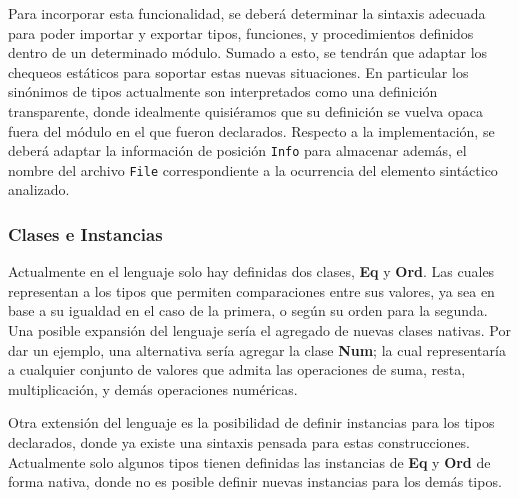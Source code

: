 Para incorporar esta funcionalidad, se deberá determinar la sintaxis adecuada para poder importar y exportar tipos, funciones, y procedimientos definidos dentro de un determinado módulo.
Sumado a esto, se tendrán que adaptar los chequeos estáticos para soportar estas nuevas situaciones.
En particular los sinónimos de tipos actualmente son interpretados como una definición transparente, donde idealmente quisiéramos que su definición se vuelva opaca fuera del módulo en el que fueron declarados.
Respecto a la implementación, se deberá adaptar la información de posición \lstinline[style = haskell]{Info} para almacenar además, el nombre del archivo \lstinline[style = haskell]{File} correspondiente a la ocurrencia del elemento sintáctico analizado.

\subsubsection{Clases e Instancias}

Actualmente en el lenguaje solo hay definidas dos clases, \textbf{Eq} y \textbf{Ord}.
Las cuales representan a los tipos que permiten comparaciones entre sus valores, ya sea en base a su igualdad en el caso de la primera, o según su orden para la segunda.
Una posible expansión del lenguaje sería el agregado de nuevas clases nativas.
Por dar un ejemplo, una alternativa sería agregar la clase \textbf{Num}; la cual representaría a cualquier conjunto de valores que admita las operaciones de suma, resta, multiplicación, y demás operaciones numéricas.

Otra extensión del lenguaje es la posibilidad de definir instancias para los tipos declarados, donde ya existe una sintaxis pensada para estas construcciones.
Actualmente solo algunos tipos tienen definidas las instancias de \textbf{Eq} y \textbf{Ord} de forma nativa, donde no es posible definir nuevas instancias para los demás tipos.

